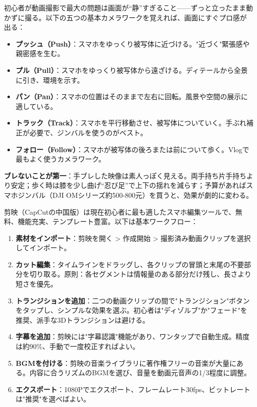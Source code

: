 
初心者が動画撮影で最大の問題は画面が“静”すぎること——ずっと立ったまま動かずに撮る。以下の五つの基本カメラワークを覚えれば、画面にすぐプロ感が出る：

\begin{itemize}
  \item \textbf{プッシュ（Push）}：スマホをゆっくり被写体に近づける。"近づく"緊張感や親密感を生む。
  \item \textbf{プル（Pull）}：スマホをゆっくり被写体から遠ざける。ディテールから全景に引き、環境を示す。
  \item \textbf{パン（Pan）}：スマホの位置はそのままで左右に回転。風景や空間の展示に適している。
  \item \textbf{トラック（Track）}：スマホを平行移動させ、被写体についていく。手ぶれ補正が必要で、ジンバルを使うのがベスト。
  \item \textbf{フォロー（Follow）}：スマホが被写体の後ろまたは前について歩く。Vlogで最もよく使うカメラワーク。
\end{itemize}

\textbf{ブレないことが第一}：手ブレした映像は素人っぽく見える。両手持ち片手持ちより安定；歩く時は膝を少し曲げ“忍び足”で上下の揺れを減らす；予算があればスマホジンバル（DJI OMシリーズ約500-800元）を買うと、効果が劇的に変わる。


剪映（CapCutの中国版）は現在初心者に最も適したスマホ編集ツールで、無料、機能充実、テンプレート豊富。以下は基本ワークフロー：

\begin{enumerate}
  \item \textbf{素材をインポート}：剪映を開く > 作成開始 > 撮影済み動画クリップを選択してインポート。
  \item \textbf{カット編集}：タイムラインをドラッグし、各クリップの冒頭と末尾の不要部分を切り取る。原則：各セグメントは情報量のある部分だけ残し、長さより短さを優先。
  \item \textbf{トランジションを追加}：二つの動画クリップの間で"トランジション"ボタンをタップし、シンプルな効果を選ぶ。初心者は"ディゾルブ"か"フェード"を推奨、派手な3Dトランジションは避ける。
  \item \textbf{字幕を追加}：剪映には"字幕認識"機能があり、ワンタップで自動生成。精度は約90\%、手動で一度校正すればよい。
  \item \textbf{BGMを付ける}：剪映の音楽ライブラリに著作権フリーの音楽が大量にある。内容に合うリズムのBGMを選び、音量を動画元音声の1/3程度に調整。
  \item \textbf{エクスポート}：1080Pでエクスポート、フレームレート30fps、ビットレートは"推奨"を選べばよい。
\end{enumerate}

